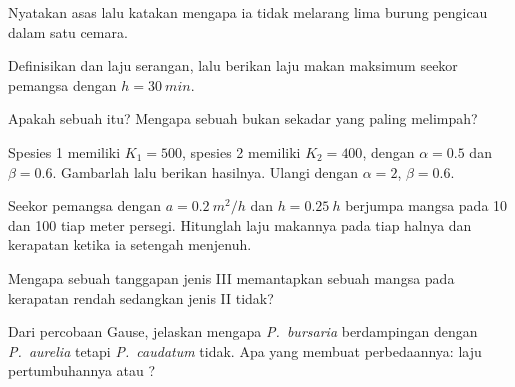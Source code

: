 \begin{exercise}[$\star$]\label{exo:b1:species-interactions:2}
Nyatakan asas  lalu katakan mengapa ia tidak
melarang lima burung pengicau dalam satu cemara.
\end{exercise}

\begin{exercise}[$\star$]\label{exo:b1:species-interactions:3}
Definisikan  dan laju serangan, lalu berikan laju
makan maksimum seekor pemangsa dengan $h = \qty{30}{min}$.
\end{exercise}

\begin{exercise}[$\star$]\label{exo:b1:species-interactions:4}
Apakah sebuah  itu? Mengapa sebuah  bukan
sekadar yang paling melimpah?
\end{exercise}

\begin{exercise}[$\star\star$]\label{exo:b1:species-interactions:5}
Spesies 1 memiliki $K_1 = 500$, spesies 2 memiliki $K_2 = 400$, dengan $\alpha =
0.5$ dan $\beta = 0.6$. Gambarlah  lalu berikan hasilnya.
Ulangi dengan $\alpha = 2$, $\beta = 0.6$.
\end{exercise}

\begin{exercise}[$\star\star$]\label{exo:b1:species-interactions:6}
Seekor pemangsa dengan $a = \qty{0.2}{m^2/h}$ dan $h = \qty{0.25}{h}$
berjumpa mangsa pada \qty{10}{} dan \qty{100}{} tiap meter persegi.
Hitunglah laju makannya pada tiap halnya dan kerapatan ketika ia
setengah menjenuh.
\end{exercise}

\begin{exercise}[$\star\star$]\label{exo:b1:species-interactions:7}
Mengapa sebuah tanggapan jenis III memantapkan sebuah  mangsa
pada kerapatan rendah sedangkan jenis II tidak?
\end{exercise}

\begin{exercise}[$\star\star$]\label{exo:b1:species-interactions:8}
Dari percobaan Gause, jelaskan mengapa \emph{P.~bursaria} berdampingan
dengan \emph{P.~aurelia} tetapi \emph{P.~caudatum} tidak. Apa yang
membuat perbedaannya: laju pertumbuhannya atau ?
\end{exercise}

